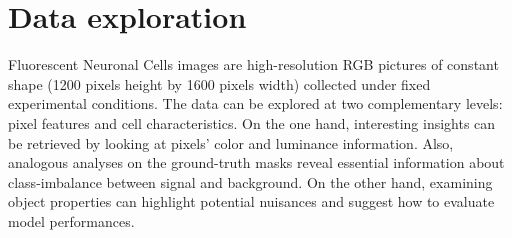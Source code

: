 \section{Data exploration}
\label{sec:data_exploration}

Fluorescent Neuronal Cells images are high-resolution RGB pictures of constant shape (1200 pixels height by 1600 pixels width) collected under fixed experimental conditions.
The data can be explored at two complementary levels: pixel features and cell characteristics. 
On the one hand, interesting insights can be retrieved by looking at pixels' color and luminance information. Also, analogous analyses on the ground-truth masks reveal essential information about class-imbalance between signal and background.
On the other hand, examining object properties can highlight potential nuisances and suggest how to evaluate model performances.

